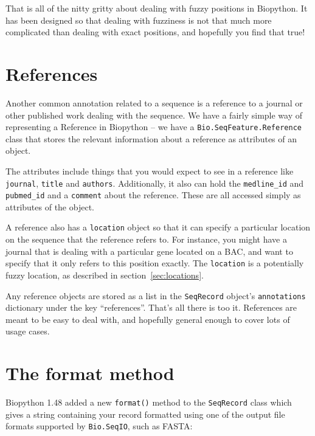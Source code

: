 \documentclass{report}
\begin{document}
That is all of the nitty gritty about dealing with fuzzy positions in Biopython. It has been designed so that dealing with fuzziness is not that much more complicated than dealing with exact positions, and hopefully you find that true!

\section{References}

Another common annotation related to a sequence is a reference to a journal or other published work dealing with the sequence. We have a fairly simple way of representing a Reference in Biopython -- we have a \verb|Bio.SeqFeature.Reference| class that stores the relevant information about a reference as attributes of an object.

The attributes include things that you would expect to see in a reference like \verb|journal|, \verb|title| and \verb|authors|. Additionally, it also can hold the \verb|medline_id| and \verb|pubmed_id| and a \verb|comment| about the reference. These are all accessed simply as attributes of the object.

A reference also has a \verb|location| object so that it can specify a particular location on the sequence that the reference refers to. For instance, you might have a journal that is dealing with a particular gene located on a BAC, and want to specify that it only refers to this position exactly. The \verb|location| is a potentially fuzzy location, as described in section~\ref{sec:locations}.

Any reference objects are stored as a list in the \verb|SeqRecord| object's \verb|annotations| dictionary under the key ``references''.
That's all there is too it. References are meant to be easy to deal with, and hopefully general enough to cover lots of usage cases.

\section{The format method}
\label{sec:SeqRecord-format}

Biopython 1.48 added a new \verb|format()| method to the \verb|SeqRecord| class which
gives a string containing your record formatted using one of the output file formats
supported by \verb|Bio.SeqIO|, such as FASTA:
\end{document}
